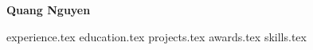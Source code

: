 \documentclass[a4paper,13pt]{article}
\begin{document}
\begin{center}
    \textbf{\LARGE Quang Nguyen}{}
\end{center}
\begin{center}
    \hspace{10mm}  
     \hspace{10mm} 
\end{center}

{experience.tex}
{education.tex}
{projects.tex}
{awards.tex}
{skills.tex}
\end{document}
